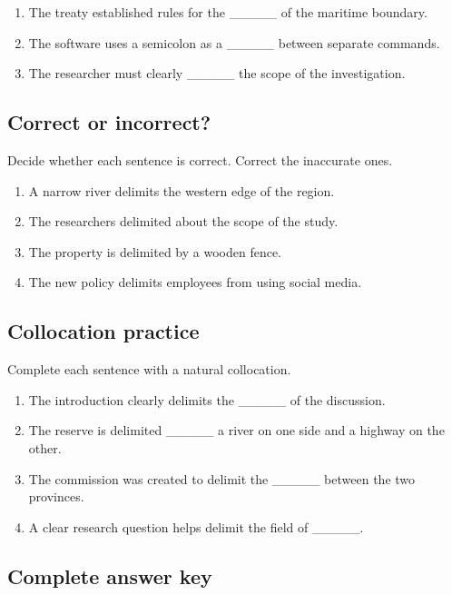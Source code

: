 \documentclass[11pt]{article}
\begin{document}
\begin{enumerate}
  \item The treaty established rules for the \_\_\_\_\_ of the maritime boundary.
  \item The software uses a semicolon as a \_\_\_\_\_ between separate commands.
  \item The researcher must clearly \_\_\_\_\_ the scope of the investigation.
\end{enumerate}

\subsection{Correct or incorrect?}
Decide whether each sentence is correct. Correct the inaccurate ones.

\begin{enumerate}
  \item A narrow river delimits the western edge of the region.
  \item The researchers delimited about the scope of the study.
  \item The property is delimited by a wooden fence.
  \item The new policy delimits employees from using social media.
\end{enumerate}

\subsection{Collocation practice}
Complete each sentence with a natural collocation.

\begin{enumerate}
  \item The introduction clearly delimits the \_\_\_\_\_ of the discussion.
  \item The reserve is delimited \_\_\_\_\_ a river on one side and a highway on the other.
  \item The commission was created to delimit the \_\_\_\_\_ between the two provinces.
  \item A clear research question helps delimit the field of \_\_\_\_\_.
\end{enumerate}

\subsection{Complete answer key}
\end{document}

